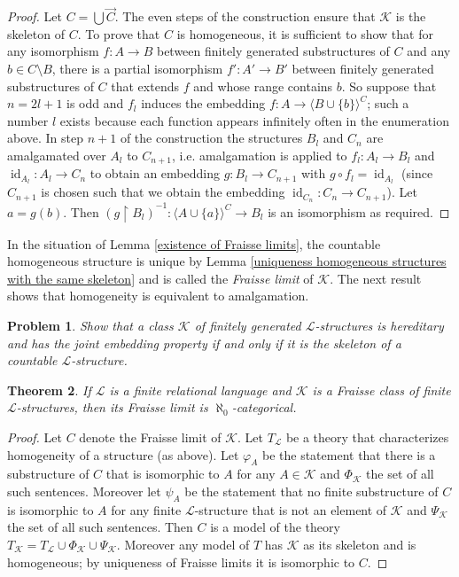 \documentclass[10pt]{amsart}
\renewcommand{\L}{\mathcal{L}}
\newcommand{\id}{\operatorname{id}}
\newcommand{\K}{\mathcal{K}}
\newtheorem{theorem}{Theorem}[subsection]
\newtheorem{problem}[theorem]{Problem}
\theoremstyle{definition}
\theoremstyle{remark}
\begin{document}
\begin{proof}
Let $C=\bigcup\vec{C}$. The even steps of the construction ensure that $\K$ is the skeleton of $C$. To prove that $C$ is homogeneous, it is sufficient to show that for any isomorphism $f\colon A\rightarrow B$ between finitely generated substructures of $C$ and any $b\in C\setminus B$, there is a partial isomorphism $f'\colon A'\rightarrow B'$ between finitely generated substructures of $C$ that extends $f$ and whose range contains $b$. So suppose that $n=2l+1$ is odd and $f_l$ 
induces the embedding $f\colon A\rightarrow \langle B\cup\{b\}\rangle^C$; such a number $l$ exists because each function appears infinitely often in the enumeration above. In step $n+1$ of the construction the structures $B_l$ and $C_n$ are amalgamated over $A_l$ to $C_{n+1}$, i.e. amalgamation is applied to $f_l\colon A_l\rightarrow B_l$ and $\id_{A_l}\colon A_l\rightarrow C_n$ to obtain an embedding $g\colon B_l\rightarrow C_{n+1}$ with $g\circ f_l=\id_{A_l}$ (since $C_{n+1}$ is chosen such that we obtain the embedding $\id_{C_n}\colon C_n\rightarrow C_{n+1}$). Let $a=g(b)$. Then $(g{\upharpoonright}B_l)^{-1}\colon \langle A\cup\{a\}\rangle^C\rightarrow B_l$ is an isomorphism as required. 
\end{proof} 

In the situation of Lemma \ref{existence of Fraisse limits}, the countable homogeneous structure is unique by Lemma \ref{uniqueness homogeneous structures with the same skeleton} and is called the \emph{Fraisse limit} of $\K$. 
The next result shows that homogeneity is equivalent to amalgamation. 

\begin{problem} 
Show that a class $\K$ of finitely generated $\L$-structures is hereditary and has the joint embedding property if and only if it is the skeleton of a countable $\L$-structure. 
\end{problem} 

\begin{theorem} 
If $\L$ is a finite relational language and $\K$ is a Fraisse class of finite $\L$-structures, then its Fraisse limit is $\aleph_0$-categorical. 
\end{theorem} 
\begin{proof} 
Let $C$ denote the Fraisse limit of $\K$. Let $T_\L$ be a theory that characterizes homogeneity of a structure (as above). Let $\varphi_A$ be the statement that there is a substructure of $C$ that is isomorphic to $A$ for any $A\in\K$ and $\Phi_\K$ the set of all such sentences. Moreover let $\psi_A$ be the statement that no finite substructure of $C$ is isomorphic to $A$ for any finite $\L$-structure that is not an element of $\K$ and $\Psi_\K$ the set of all such sentences. Then $C$ is a model of the theory $T_\K=T_\L\cup \Phi_\K\cup\Psi_\K$. Moreover any model of $T$ has $\K$ as its skeleton and is homogeneous; by uniqueness of Fraisse limits it is isomorphic to $C$. 
\end{proof} 
\end{document}
